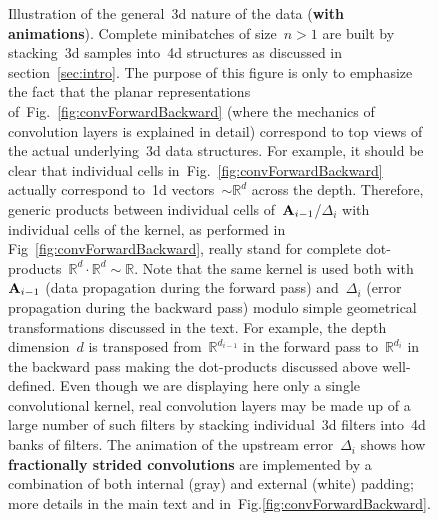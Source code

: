 \documentclass{article}
\begin{document}
\begin{figure}[!ht]
\caption{Illustration of the general~3d nature of the data ({\bf with animations}). Complete minibatches of size~$n>1$ are built by stacking~3d samples into~4d structures as discussed in section~\ref{sec:intro}.  The purpose of this figure is only to emphasize the fact that the planar representations of~Fig.~\ref{fig:convForwardBackward} (where the mechanics of convolution layers is explained in detail) correspond to top views of the actual underlying~3d data structures.  For example, it should be clear that individual cells in~Fig.~\ref{fig:convForwardBackward} actually correspond to~1d vectors~$\sim \mathbb{R}^d$ across the depth.  Therefore, generic products between individual cells of~${\bf A}_{i-1}$/$\Delta_i$ with individual cells of the kernel, as performed in Fig~\ref{fig:convForwardBackward}, really stand for complete dot-products~$\mathbb{R}^d \cdot \mathbb{R}^d \sim \mathbb{R}$.  Note that the same kernel is used both with~${\bf A}_{i-1}$ (data propagation during the forward pass) and~$\Delta_i$ (error propagation during the backward pass) modulo simple geometrical transformations discussed in the text.  For example, the depth dimension~$d$ is transposed from~$\mathbb{R}^{d_{i-1}}$ in the forward pass to~$\mathbb{R}^{d_i}$ in the backward pass making the dot-products discussed above well-defined. Even though we are displaying here only a single convolutional kernel, real convolution layers may be made up of a large number of such filters by stacking individual~3d filters into~4d banks of filters.  The animation of the upstream error~$\Delta_i$ shows how {\bf fractionally strided convolutions} are implemented by a combination of both internal (gray) and external (white) padding; more details in the main text and in~Fig.\ref{fig:convForwardBackward}.} 
\label{fig:dataDepth}
\end{figure}
\end{document}

